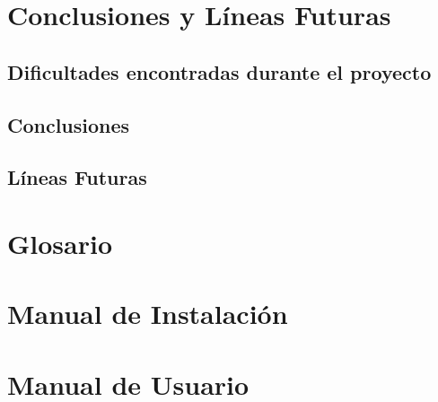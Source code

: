 \documentclass[12pt, a4paper, twoside]{article}
\begin{document}
\section{Conclusiones y Líneas Futuras}

\subsection{Dificultades encontradas durante el proyecto}


\subsection{Conclusiones}


\subsection{Líneas Futuras}

\newpage\cleardoublepage

{}

\newpage\cleardoublepage

\begin{umaappendices}
  \section{Glosario}
  \printnoidxglossaries
  

  \section{Manual de Instalación}
  
  
  \section{Manual de Usuario}
  

\end{umaappendices}



\end{document}
